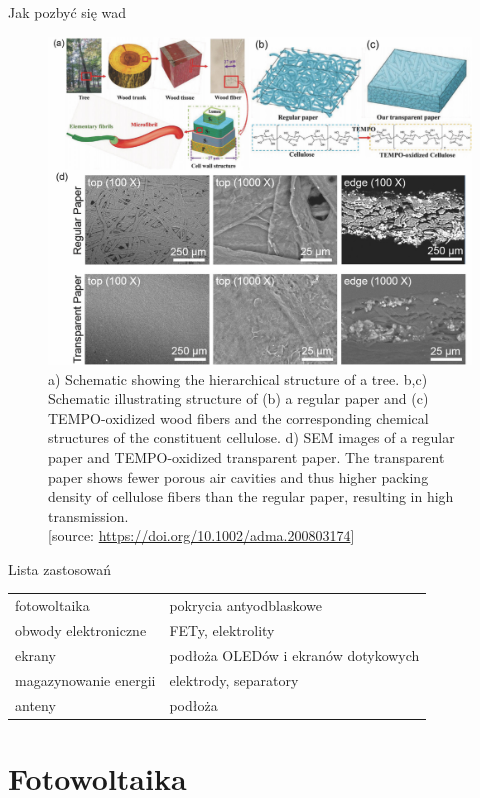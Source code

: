 \documentclass{beamer}
\begin{document}
\begin{frame}{Jak pozbyć się wad}
        \begin{figure}[h]
        \centering
        \includegraphics[width=0.7\linewidth]{fig1}
        \caption{a) Schematic showing the hierarchical structure of a tree. b,c) Schematic illustrating structure of (b) a regular paper and (c) TEMPO-oxidized wood fibers and the corresponding chemical structures of the constituent cellulose. d) SEM images of a regular paper and TEMPO-oxidized transparent paper. The transparent paper shows fewer porous air cavities and thus higher packing density of cellulose fibers than the regular paper, resulting in high transmission.\\
        \typeout{}
        [source: \url{https://doi.org/10.1002/adma.200803174}]
        }
        
    \end{figure}
\end{frame}

\begin{frame}{Lista zastosowań}
\begin{tabular}{@{$\blacktriangleright$ }l @{$\quad\to\quad$ } l}
    fotowoltaika & pokrycia antyodblaskowe \\
    obwody elektroniczne & FETy, elektrolity \\
    ekrany & podłoża OLEDów i ekranów dotykowych \\
    magazynowanie energii & elektrody, separatory \\
    anteny & podłoża \\
\end{tabular}
\end{frame}


\section{Fotowoltaika}
\end{document}

